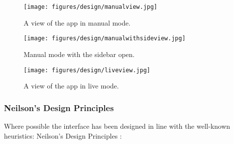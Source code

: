 \documentclass{article}
\begin{document}
\begin{figure}[H]
\centering
\begin{minipage}{.5\textwidth}
  \centering
  \texttt{[image: figures/design/manualview.jpg]}
  \caption{A view of the app in manual mode.}
  \label{fig:manualview}
\end{minipage}%
\begin{minipage}{.5\textwidth}
  \centering
  \texttt{[image: figures/design/manualwithsideview.jpg]}
  \caption{Manual mode with the sidebar open.}
  \label{fig:manualviewbar}
\end{minipage}
\end{figure}

\begin{figure}[h]
    \centering
    \texttt{[image: figures/design/liveview.jpg]}
        \caption{A view of the app in live mode.}
        \label{fig:liveview}
\end{figure}

\subsubsection{Neilson's Design Principles}
Where possible the interface has been designed in line with the well-known heuristics: Neilson's Design Principles \cite{design:neilsons}:
\end{document}
